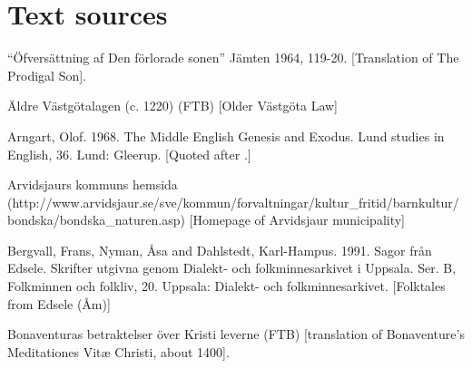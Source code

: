 
\chapter[Text sources]{\rmfamily Text sources}

\item 

“Öfversättning af Den förlorade sonen” Jämten 1964, 119-20. [Translation of The Prodigal Son]. 

\item 

\label{bkm:Ref154219978}Äldre Västgötalagen (c. 1220) (FTB) [Older Västgöta Law]


\item 

\label{bkm:Ref151372879}Arngart, Olof. 1968. The Middle English Genesis and Exodus. Lund studies in English, 36. Lund: Gleerup. [Quoted after \citet{Allen1997}.]

\item 

\label{bkm:Ref137879837}Arvidsjaurs kommuns hemsida (http://www.arvidsjaur.se/sve/kommun/forvaltningar/kultur\_fritid/barnkultur/bondska/bondska\_naturen.asp) [Homepage of Arvidsjaur municipality]


\item 

\label{bkm:Ref150329670}Bergvall, Frans, Nyman, Åsa and Dahlstedt, Karl-Hampus. 1991. Sagor från Edsele. Skrifter utgivna genom Dialekt- och folkminnesarkivet i Uppsala. Ser. B, Folkminnen och folkliv, 20. Uppsala: Dialekt- och folkminnesarkivet. [Folktales from Edsele (Åm)]


\item 

\label{bkm:Ref154213744}Bonaventuras betraktelser över Kristi leverne (FTB) [translation of Bonaventure’s Meditationes Vitæ Christi, about 1400]. 

